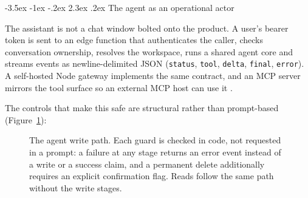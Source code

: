 \documentclass[10pt,a4paper,twocolumn]{article}
\makeatletter
\renewcommand\section{\@startsection{section}{1}{\z@}
  {-3.5ex \@plus -1ex \@minus -.2ex}
  {2.3ex \@plus.2ex}
  {\normalfont\Large\bfseries\hyphenpenalty=10000\exhyphenpenalty=10000}}
\makeatother
\begin{document}
\section{The agent as an operational actor}
\label{sec:agent}

The assistant is not a chat window bolted onto the product. A user's bearer token is
sent to an edge function that authenticates the caller, checks conversation
ownership, resolves the workspace, runs a shared agent core and streams events as
newline-delimited JSON (\texttt{status}, \texttt{tool}, \texttt{delta},
\texttt{final}, \texttt{error}). A self-hosted Node gateway implements the same
contract, and an MCP server mirrors the tool surface so an external MCP host can use
it \cite{mcp}.

The controls that make this safe are structural rather than prompt-based
(Figure~\ref{fig:agentpath}):

\begin{figure}[t]
\centering
{}
\caption{The agent write path. Each guard is checked in code, not requested in a
prompt: a failure at any stage returns an error event instead of a write or a
success claim, and a permanent delete additionally requires an explicit
confirmation flag. Reads follow the same path without the write stages.}
\label{fig:agentpath}
\end{figure}
\end{document}

